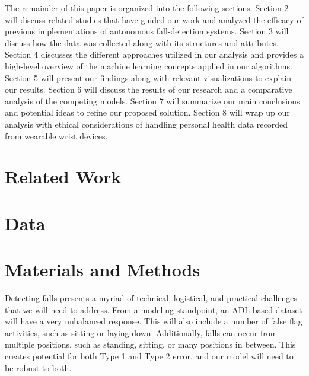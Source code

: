 \documentclass{llncs}
\begin{document}
	
	The remainder of this paper is organized into the following sections. Section 2 will discuss related studies that have guided our work and analyzed the efficacy of previous implementations of autonomous fall-detection systems. Section 3 will discuss how the data was collected along with its structures and attributes. Section 4 discusses the different approaches utilized in our analysis and provides a high-level overview of the machine learning concepts applied in our algorithms. Section 5 will present our findings along with relevant visualizations to explain our results. Section 6 will discuss the results of our research and a comparative analysis of the competing models. Section 7 will summarize our main conclusions and potential ideas to refine our proposed solution. Section 8 will wrap up our analysis with ethical considerations of handling personal health data recorded from wearable wrist devices.

	

	
\section{Related Work} 
\section{Data}
\section{Materials and Methods}
	Detecting falls presents a myriad of technical, logistical, and practical challenges that we will need to address. From a modeling standpoint, an ADL-based dataset will have a very unbalanced response. This will also include a number of false flag activities, such as sitting or laying down. Additionally, falls can occur from multiple positions, such as standing, sitting, or many positions in between. This creates potential for both Type 1 and Type 2 error, and our model will need to be robust to both.
    
\end{document}
